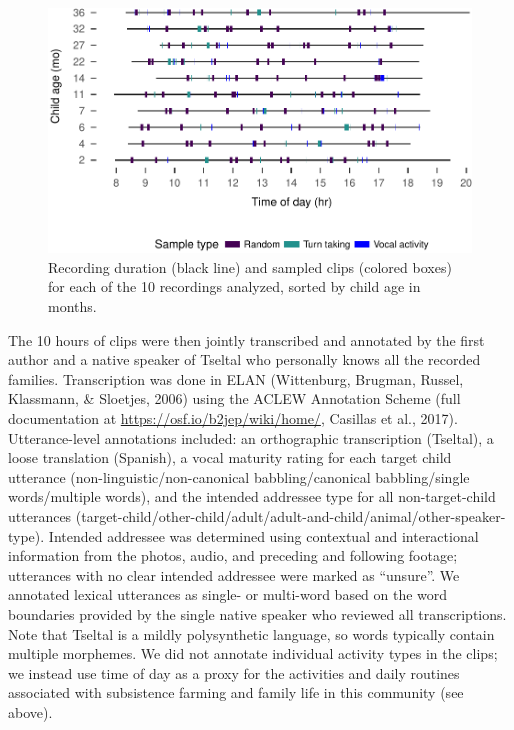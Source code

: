 \documentclass[floatsintext,man]{apa6}
\theoremstyle{definition}
\theoremstyle{definition}
\theoremstyle{definition}
\theoremstyle{remark}
\begin{document}
\begin{figure}
\centering
\includegraphics{Tseltal-CLE_files/figure-latex/fig2-1.pdf}
\caption{\label{fig:fig2}Recording duration (black line) and sampled clips
(colored boxes) for each of the 10 recordings analyzed, sorted by child
age in months.}
\end{figure}

The 10 hours of clips were then jointly transcribed and annotated by the
first author and a native speaker of Tseltal who personally knows all
the recorded families. Transcription was done in ELAN (Wittenburg,
Brugman, Russel, Klassmann, \& Sloetjes, 2006) using the ACLEW
Annotation Scheme (full documentation at
\url{https://osf.io/b2jep/wiki/home/}, Casillas et al., 2017).
Utterance-level annotations included: an orthographic transcription
(Tseltal), a loose translation (Spanish), a vocal maturity rating for
each target child utterance (non-linguistic/non-canonical
babbling/canonical babbling/single words/multiple words), and the
intended addressee type for all non-target-child utterances
(target-child/other-child/adult/adult-and-child/animal/other-speaker-type).
Intended addressee was determined using contextual and interactional
information from the photos, audio, and preceding and following footage;
utterances with no clear intended addressee were marked as
\enquote{unsure}. We annotated lexical utterances as single- or
multi-word based on the word boundaries provided by the single native
speaker who reviewed all transcriptions. Note that Tseltal is a mildly
polysynthetic language, so words typically contain multiple morphemes.
We did not annotate individual activity types in the clips; we instead
use time of day as a proxy for the activities and daily routines
associated with subsistence farming and family life in this community
(see above).
\end{document}
